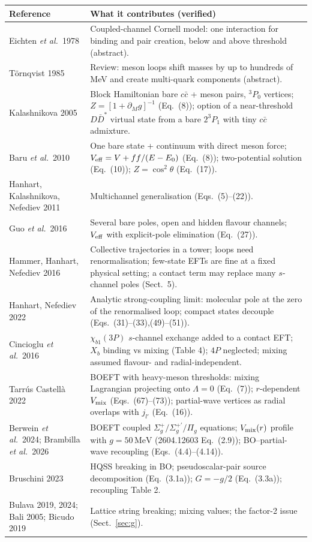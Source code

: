 \documentclass[11pt,a4paper]{article}
\renewcommand{\MeV}{\,\mathrm{MeV}}
\begin{document}
\begin{center}
\small
\begin{tabular}{>{\raggedright\arraybackslash}p{3.5cm}>{\raggedright\arraybackslash}p{11.6cm}}
\toprule
Reference & What it contributes (verified) \\
\midrule
Eichten \emph{et al.}\ 1978 & Coupled-channel Cornell model: one interaction for binding and pair creation, below and above threshold (abstract).\\
T\"ornqvist 1985 & Review: meson loops shift masses by up to hundreds of MeV and create multi-quark components (abstract).\\
Kalashnikova 2005 & Block Hamiltonian bare $c\bar c$ + meson pairs, $^3P_0$ vertices; $Z=[1+\partial_Mg]^{-1}$ (Eq.~(8)); option of a near-threshold $D\bar D^*$ virtual state from a bare $2^3P_1$ with tiny $c\bar c$ admixture.\\
Baru \emph{et al.}\ 2010 & One bare state + continuum with direct meson force; $V_{\rm eff}=V+ff/(E-E_0)$ (Eq.~(8)); two-potential solution (Eq.~(10)); $Z=\cos^2\theta$ (Eq.~(17)).\\
Hanhart, Kalashnikova, Nefediev 2011 & Multichannel generalisation (Eqs.~(5)--(22)).\\
Guo \emph{et al.}\ 2016 & Several bare poles, open and hidden flavour channels; $V_{\rm eff}$ with explicit-pole elimination (Eq.~(27)).\\
Hammer, Hanhart, Nefediev 2016 & Collective trajectories in a tower; loops need renormalisation; few-state EFTs are fine at a fixed physical setting; a contact term may replace many $s$-channel poles (Sect.~5).\\
Hanhart, Nefediev 2022 & Analytic strong-coupling limit: molecular pole at the zero of the renormalised loop; compact states decouple (Eqs.~(31)--(33),(49)--(51)).\\
Cincioglu \emph{et al.}\ 2016 & $\chi_{b1}(3P)$ $s$-channel exchange added to a contact EFT; $X_b$ binding vs mixing (Table 4); $4P$ neglected; mixing assumed flavour- and radial-independent.\\
Tarr\'us Castell\`a 2022 & BOEFT with heavy-meson thresholds: mixing Lagrangian projecting onto $\Lambda=0$ (Eq.~(7)); $r$-dependent $V_{\rm mix}$ (Eqs.~(67)--(73)); partial-wave vertices as radial overlaps with $j_{l'}$ (Eq.~(16)).\\
Berwein \emph{et al.}\ 2024; Brambilla \emph{et al.}\ 2026 & BOEFT coupled $\Sigma_g^+/\Sigma_g^{+\prime}/\Pi_g$ equations; $V_{\rm mix}(r)$ profile with $g=50\MeV$ (2604.12603 Eq.~(2.9)); BO--partial-wave recoupling (Eqs.~(4.4)--(4.14)).\\
Bruschini 2023 & HQSS breaking in BO; pseudoscalar-pair source decomposition (Eq.~(3.1a)); $G=-g/2$ (Eq.~(3.3a)); recoupling Table 2.\\
Bulava 2019, 2024; Bali 2005; Bicudo 2019 & Lattice string breaking; mixing values; the factor-2 issue (Sect.~\ref{sec:g}).\\
\bottomrule
\end{tabular}
\end{center}
\end{document}
